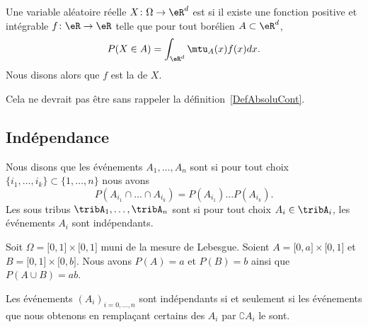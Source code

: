 \begin{definition}      \label{DEFooRNKZooRczFwB}
    Une variable aléatoire réelle \( X\colon \Omega\to \eR^d\) est  si il existe une fonction positive et intégrable \( f\colon \eR\to \eR\) telle que pour tout borélien \( A\subset \eR^d\),
	\begin{equation}
        P(X\in A)=\int_{\eR^d}\mtu_A(x)f(x)dx.
	\end{equation}
	Nous disons alors que \( f\) est la  de \( X\).
\end{definition}
Cela ne devrait pas être sans rappeler la définition~\ref{DefAbsoluCont}.

\subsection{Indépendance}

\begin{definition}      \label{DEFooVYCUooKWvReO}
	Nous disons que les événements \( A_1,\ldots,A_n\) sont  si pour tout choix \( \{ i_1,\ldots,i_k \}\subset\{ 1,\ldots,n \}\) nous avons
	\begin{equation}
		P(A_{i_1}\cap\ldots\cap A_{i_k})=P(A_{i_1})\ldots P(A_{i_k}).
	\end{equation}
	Les sous tribus \( \tribA_1,\ldots,\tribA_n\) sont  si pour tout choix \( A_i\in \tribA_i\), les événements \( A_i\) sont indépendants.
\end{definition}

\begin{example}
	Soit \( \Omega=\mathopen[ 0 , 1 \mathclose]\times \mathopen[ 0 , 1 \mathclose]\) muni de la mesure de Lebesgue. Soient \( A=\mathopen[ 0 , a \mathclose]\times \mathopen[ 0 , 1 \mathclose]\) et \( B=\mathopen[ 0 , 1 \mathclose]\times \mathopen[ 0 , b \mathclose]\). Nous avons \( P(A)=a\) et \( P(B)=b\) ainsi que \( P(A\cup B)=ab\).
\end{example}

\begin{lemma}       \label{LemIndepEvenCompl}
	Les événements \( (A_i)_{i=0,\ldots,n}\) sont indépendants si et seulement si les événements que nous obtenons en remplaçant certains des \( A_i\) par \( \complement A_i\) le sont.
\end{lemma}

